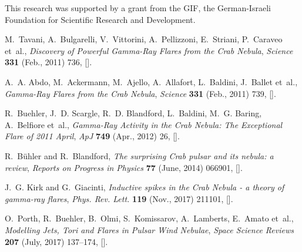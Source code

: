 \documentclass{PoS}
\newcommand{\ssr}{Space Science Reviews}
\newcommand{\apj}{ApJ}
\newcommand{\prl}{Phys. Rev. Lett.}
\begin{document}
\acknowledgments 
This research was supported by a grant from the GIF,
the German-Israeli Foundation for Scientific Research and Development.





\providecommand{\href}[2]{#2}\begingroup\raggedright\begin{thebibliography}{10}

M.~{Tavani}, A.~{Bulgarelli}, V.~{Vittorini}, A.~{Pellizzoni}, E.~{Striani},
  P.~{Caraveo} et~al., \emph{{Discovery of Powerful Gamma-Ray Flares from the
  Crab Nebula}}, \href{https://doi.org/10.1126/science.1200083}{\emph{Science}
  {\bfseries 331} (Feb., 2011) 736},
  [\href{https://arxiv.org/abs/1101.2311}{{}}].

A.~A. {Abdo}, M.~{Ackermann}, M.~{Ajello}, A.~{Allafort}, L.~{Baldini},
  J.~{Ballet} et~al., \emph{{Gamma-Ray Flares from the Crab Nebula}},
  \href{https://doi.org/10.1126/science.1199705}{\emph{Science} {\bfseries 331}
  (Feb., 2011) 739}, [\href{https://arxiv.org/abs/1011.3855}{{}}].

R.~{Buehler}, J.~D. {Scargle}, R.~D. {Blandford}, L.~{Baldini}, M.~G. {Baring},
  A.~{Belfiore} et~al., \emph{{Gamma-Ray Activity in the Crab Nebula: The
  Exceptional Flare of 2011 April}},
  \href{https://doi.org/10.1088/0004-637X/749/1/26}{\emph{\apj} {\bfseries 749}
  (Apr., 2012) 26}, [\href{https://arxiv.org/abs/1112.1979}{{}}].

R.~{B{\"u}hler} and R.~{Blandford}, \emph{{The surprising Crab pulsar and its
  nebula: a review}},
  \href{https://doi.org/10.1088/0034-4885/77/6/066901}{\emph{Reports on
  Progress in Physics} {\bfseries 77} (June, 2014) 066901},
  [\href{https://arxiv.org/abs/1309.7046}{{}}].

J.~G. {Kirk} and G.~{Giacinti}, \emph{{Inductive spikes in the Crab Nebula - a
  theory of gamma-ray flares}},
  \href{https://doi.org/10.1103/PhysRevLett.119.211101}{\emph{\prl} {\bfseries
  119} (Nov., 2017) 211101},
  [\href{https://arxiv.org/abs/1710.04493}{{}}].

O.~{Porth}, R.~{Buehler}, B.~{Olmi}, S.~{Komissarov}, A.~{Lamberts}, E.~{Amato}
  et~al., \emph{{Modelling Jets, Tori and Flares in Pulsar Wind Nebulae}},
  \href{https://doi.org/10.1007/s11214-017-0344-x}{\emph{\ssr} {\bfseries 207}
  (July, 2017) 137--174}, [\href{https://arxiv.org/abs/1703.05184}{{}}].


\end{thebibliography}
\end{document}
